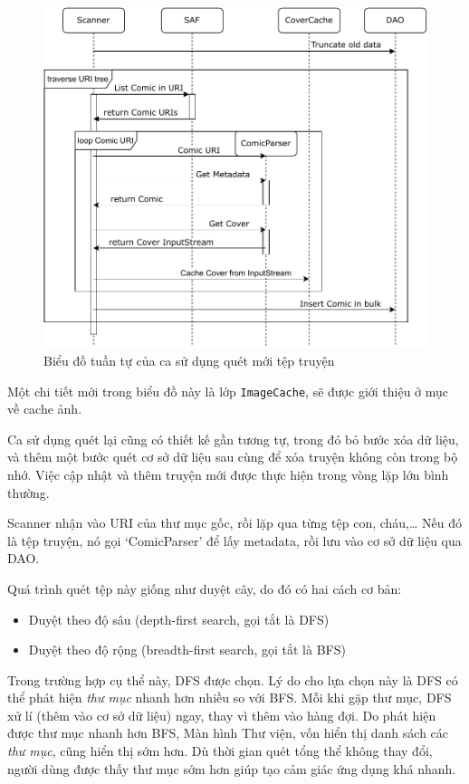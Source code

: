 \documentclass[../../../../thesis]{subfiles}
\begin{document}
\begin{figure}[H]
    \centering
    \includegraphics[scale=0.8]{../images/scan_new_sequence.pdf}
    \caption{Biểu đồ tuần tự của ca sử dụng quét mới tệp truyện}
    \label{fig:scan_new_sequence}
\end{figure}

Một chi tiết mới trong biểu đồ này là lớp \texttt{ImageCache}, sẽ được giới
thiệu ở mục về cache ảnh.

Ca sử dụng quét lại cũng có thiết kế gần tương tự, trong đó bỏ bước xóa dữ liệu,
và thêm một bước quét cơ sở dữ liệu sau cùng để xóa truyện không còn trong bộ
nhớ. Việc cập nhật và thêm truyện mới được thực hiện trong vòng lặp lớn bình
thường.

Scanner nhận vào URI của thư mục gốc, rồi lặp qua từng tệp con, cháu,\ldots{}
Nếu đó là tệp truyện, nó gọi `ComicParser' để lấy metadata, rồi lưu vào cơ sở dữ
liệu qua DAO.

Quá trình quét tệp này giống như duyệt cây, do đó có hai cách cơ bản:

\begin{itemize}
    \item
        Duyệt theo độ sâu (depth-first search, gọi tắt là DFS)
    \item
        Duyệt theo độ rộng (breadth-first search, gọi tắt là BFS)
\end{itemize}

Trong trường hợp cụ thể này, DFS được chọn. Lý do cho lựa chọn này là DFS có thể
phát hiện \emph{thư mục} nhanh hơn nhiều so với BFS. Mỗi khi gặp thư mục, DFS xử
lí (thêm vào cơ sở dữ liệu) ngay, thay vì thêm vào hàng đợi. Do phát hiện được
thư mục nhanh hơn BFS, Màn hình Thư viện, vốn hiển thị danh sách các \emph{thư
mục}, cũng hiển thị sớm hơn. Dù thời gian quét tổng thể không thay đổi, người
dùng được thấy thư mục sớm hơn giúp tạo cảm giác ứng dụng khá nhanh.
\end{document}
